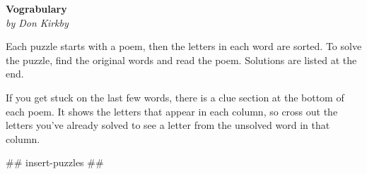 \documentclass[letterpaper,10pt]{extarticle}
\begin{document}
   \begin{center}
      \Large\textbf{Vograbulary}\\
      \large\textit{by Don Kirkby}
   \end{center}
{\fontsize{10pt}{0.1em}\selectfont
Each puzzle starts with a poem, then the letters in each word are sorted. To
solve the puzzle, find the original words and read the poem. Solutions are
listed at the end.

If you get stuck on the last few words, there is a clue section at the bottom of
each poem. It shows the letters that appear in each column, so cross out the
letters you've already solved to see a letter from the unsolved word in that
column.
}

## insert-puzzles ##
\end{document}

